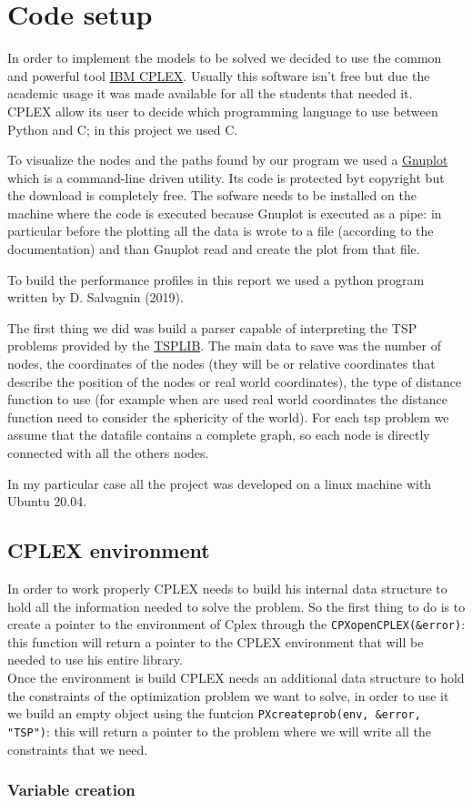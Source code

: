 \section{Code setup}
In order to implement the models to be solved we decided to use the common and powerful tool \href{https://www.ibm.com/products/ilog-cplex-optimization-studio}{IBM CPLEX}. Usually this software isn't free but due the academic usage it was made available for all the students that needed it.\\
CPLEX allow its user to decide which programming language to use between Python and C; in this project we used C.

To visualize the nodes and the paths found by our program we used a \href{https://www.gnuplot.info}{Gnuplot} which is a command-line driven utility. Its code is protected byt copyright but the download is completely free. The sofware needs to be installed on the machine where the code is executed because Gnuplot is executed as a pipe: in particular before the plotting all the data is wrote to a file (according to the documentation) and than Gnuplot read and create the plot from that file.

To build the performance profiles in this report we used a python program written by D. Salvagnin (2019).


The first thing we did was build a parser capable of interpreting the TSP problems provided by the \href{http://comopt.ifi.uni-heidelberg.de/software/TSPLIB95/}{TSPLIB}. The main data to save was the number of nodes, the coordinates of the nodes (they will be or relative coordinates that describe the position of the nodes or real world coordinates), the type of distance function to use (for example when are used real world coordinates the distance function need to consider the sphericity of the world). For each tsp problem we assume that the datafile contains a complete graph, so each node is directly connected with all the others nodes.

In my particular case all the project was developed on a linux machine with Ubuntu 20.04.

\subsection{CPLEX environment}
In order to work properly CPLEX needs to build his internal data structure to hold all the information needed to solve the problem. So the first thing to do is to create a pointer to the environment of Cplex through the \lstinline|CPXopenCPLEX(&error)|: this function will return a pointer to the CPLEX environment that will be needed to use his entire library.\\
Once the environment is build CPLEX needs an additional data structure to hold the constraints of the optimization problem we want to solve, in order to use it we build an empty object using the funtcion \lstinline|PXcreateprob(env, &error, "TSP")|: this will return a pointer to the problem where we will write all the constraints that we need.

\subsubsection{Variable creation}